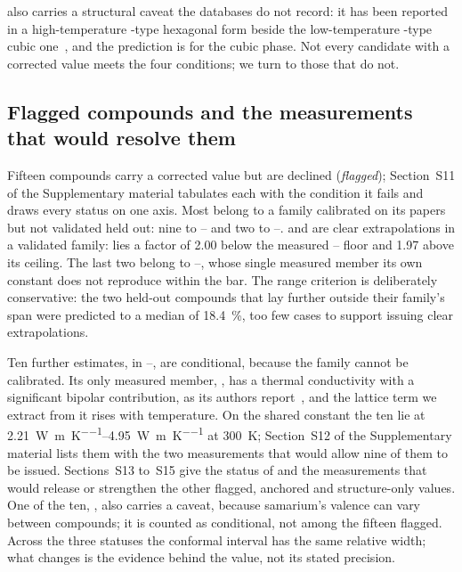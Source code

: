  also carries a structural caveat the databases do not record: it has been reported in a
high-temperature -type hexagonal form beside the low-temperature -type cubic
one~\cite{skolozdra1997magnetic}, and the prediction is for the cubic phase. Not every candidate
with a corrected value meets the four conditions; we turn to those that do not.

\subsection{Flagged compounds and the measurements that would resolve them}
\label{sec:refusals}

Fifteen compounds carry a corrected value but are declined (\emph{flagged}); Section~S11 of the
Supplementary material tabulates each with the condition it fails and draws every status on one axis.
Most belong to a family calibrated on its papers but not validated held out: nine to
-- and two to --.  and  are clear extrapolations
in a validated family:  lies a factor of \num{2.00} below the measured --
floor and  \num{1.97} above its ceiling. The last two belong to --, whose
single measured member its own constant does not reproduce within the bar. The range criterion is
deliberately conservative: the two held-out compounds that lay further outside their family's span
were predicted to a median of \SI{18.4}{\percent}, too few cases to support issuing clear
extrapolations.

Ten further estimates, in --, are conditional, because the family cannot be
calibrated. Its only measured member, , has a thermal conductivity with a significant
bipolar contribution, as its authors report~\cite{li2015synthesis}, and the lattice term we extract
from it rises with temperature. On the shared constant the ten lie at
\SIrange{2.21}{4.95}{\watt\per\meter\per\kelvin} at \SI{300}{\kelvin}; Section~S12 of the
Supplementary material lists them with the two measurements that would allow nine of them to be
issued. Sections~S13 to~S15 give the status of  and the measurements that would release or
strengthen the other flagged, anchored and structure-only values. One of the ten, , also carries a caveat, because samarium's valence can vary
between compounds; it is counted as conditional, not among the fifteen flagged. Across the three
statuses the conformal interval has the same relative width; what changes is the evidence behind the
value, not its stated precision.

